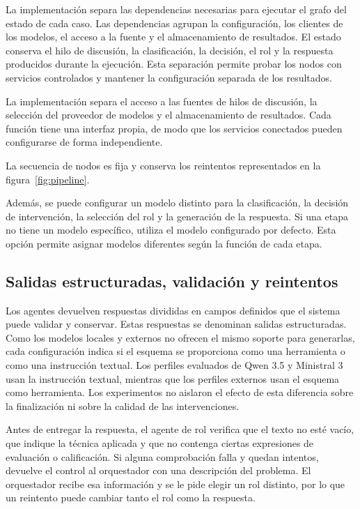 La implementación separa las dependencias necesarias para ejecutar el grafo del estado de cada caso. Las dependencias agrupan la configuración, los clientes de los modelos, el acceso a la fuente y el almacenamiento de resultados. El estado conserva el hilo de discusión, la clasificación, la decisión, el rol y la respuesta producidos durante la ejecución. Esta separación permite probar los nodos con servicios controlados y mantener la configuración separada de los resultados.

La implementación separa el acceso a las fuentes de hilos de discusión, la selección del proveedor de modelos y el almacenamiento de resultados. Cada función tiene una interfaz propia, de modo que los servicios conectados pueden configurarse de forma independiente.

La secuencia de nodos es fija y conserva los reintentos representados en la figura~\ref{fig:pipeline}.

Además, se puede configurar un modelo distinto para la clasificación, la decisión de intervención, la selección del rol y la generación de la respuesta. Si una etapa no tiene un modelo específico, utiliza el modelo configurado por defecto. Esta opción permite asignar modelos diferentes según la función de cada etapa.

\subsection{Salidas estructuradas, validación y reintentos}

Los agentes devuelven respuestas divididas en campos definidos que el sistema puede validar y conservar. Estas respuestas se denominan salidas estructuradas. Como los modelos locales y externos no ofrecen el mismo soporte para generarlas, cada configuración indica si el esquema se proporciona como una herramienta o como una instrucción textual. Los perfiles evaluados de Qwen 3.5 y Ministral 3 usan la instrucción textual, mientras que los perfiles externos usan el esquema como herramienta. Los experimentos no aislaron el efecto de esta diferencia sobre la finalización ni sobre la calidad de las intervenciones.

Antes de entregar la respuesta, el agente de rol verifica que el texto no esté vacío, que indique la técnica aplicada y que no contenga ciertas expresiones de evaluación o calificación. Si alguna comprobación falla y quedan intentos, devuelve el control al orquestador con una descripción del problema. El orquestador recibe esa información y se le pide elegir un rol distinto, por lo que un reintento puede cambiar tanto el rol como la respuesta.


